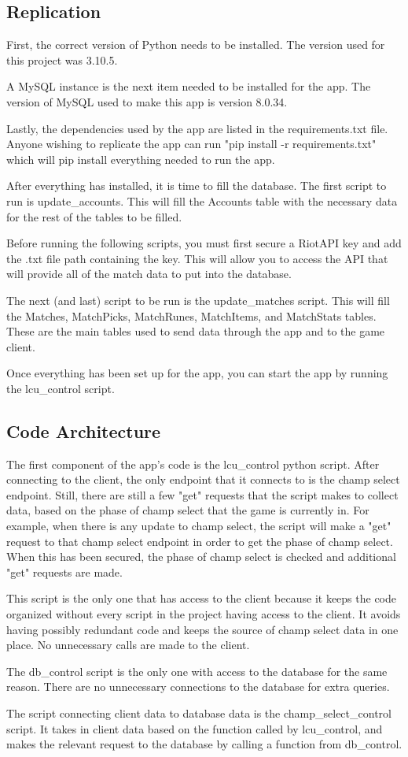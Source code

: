 \documentclass[10pt,twocolumn]{article}
\begin{document}
\subsection{Replication}
First, the correct version of Python needs to be installed.
The version used for this project was 3.10.5.

A MySQL instance is the next item needed to be installed for the app.
The version of MySQL used to make this app is version 8.0.34.

Lastly, the dependencies used by the app are listed in the requirements.txt file.
Anyone wishing to replicate the app can run "pip install -r requirements.txt" which will pip install everything needed to run the app.

After everything has installed, it is time to fill the database.
The first script to run is update\_accounts.
This will fill the Accounts table with the necessary data for the rest of the tables to be filled.

Before running the following scripts, you must first secure a RiotAPI key and add the .txt file path containing the key.
This will allow you to access the API that will provide all of the match data to put into the database.

The next (and last) script to be run is the update\_matches script.
This will fill the Matches, MatchPicks, MatchRunes, MatchItems, and MatchStats tables.
These are the main tables used to send data through the app and to the game client.

Once everything has been set up for the app, you can start the app by running the lcu\_control script.

\subsection{Code Architecture}
The first component of the app's code is the lcu\_control python script.
After connecting to the client, the only endpoint that it connects to is the champ select endpoint.
Still, there are still a few "get" requests that the script makes to collect data, based on the phase of champ select that the game is currently in.
For example, when there is any update to champ select, the script will make a "get" request to that champ select endpoint in order to get the phase of champ select.
When this has been secured, the phase of champ select is checked and additional "get" requests are made.

This script is the only one that has access to the client because it keeps the code organized without every script in the project having access to the client.
It avoids having possibly redundant code and keeps the source of champ select data in one place.
No unnecessary calls are made to the client.

The db\_control script is the only one with access to the database for the same reason.
There are no unnecessary connections to the database for extra queries.

The script connecting client data to database data is the champ\_select\_control script.
It takes in client data based on the function called by lcu\_control, and makes the relevant request to the database by calling a function from db\_control.


\printbibliography
\end{document}
